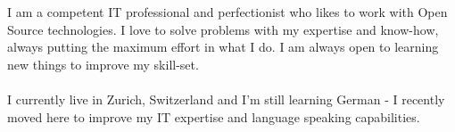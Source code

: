 I am a competent IT professional and perfectionist who likes to work with Open Source technologies.
I love to solve problems with my expertise and know-how, always putting the maximum effort in what I do.
I am always open to learning new things to improve my skill-set.\\
\\
I currently live in Zurich, Switzerland and I'm still learning German - I recently moved here to 
improve my IT expertise and language speaking capabilities.
